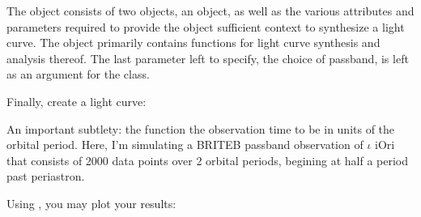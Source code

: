 \documentclass[letterpaper,10pt,english]{sphinxmanual}
\begin{document}
\sphinxAtStartPar
The  object consists of two  objects, an  object, as well as the various attributes and parameters required to provide the  object sufficient context to synthesize a light curve. The  object primarily contains functions for light curve synthesis and analysis thereof. The last parameter left to specify, the choice of passband, is left as an argument for the  class.

\sphinxAtStartPar
Finally, create a light curve:

\begin{sphinxVerbatim}[commandchars=\\\{\}]
  
  

  \PYG{p}{[}\PYG{p}{]}
     

    
\end{sphinxVerbatim}

\sphinxAtStartPar
An important subtlety: the  function  the observation time to be in units of the orbital period. Here, I’m simulating a BRITE\sphinxhyphen{}B passband observation of \({\iota}\) iOri that consists of 2000 data points over 2 orbital periods, begining at half a period past periastron.

\sphinxAtStartPar
Using , you may plot your results:
\end{document}
